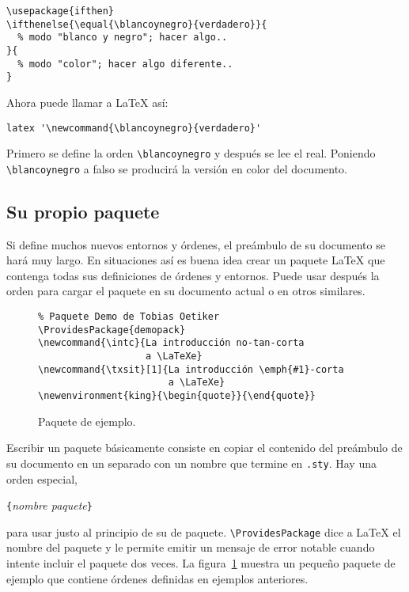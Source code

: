 \begin{verbatim}
\usepackage{ifthen}
\ifthenelse{\equal{\blancoynegro}{verdadero}}{
  % modo "blanco y negro"; hacer algo..
}{
  % modo "color"; hacer algo diferente..
}
\end{verbatim}

Ahora puede llamar a \LaTeX{} así:
\begin{verbatim}
latex '\newcommand{\blancoynegro}{verdadero}'
\end{verbatim}

Primero se define la orden \verb|\blancoynegro| y después se lee el \filenomo{} real.  Poniendo \verb|\blancoynegro| a falso se producirá la versión en color del documento.

\subsection{Su propio paquete}

Si define muchos nuevos entornos y órdenes, el preámbulo de su documento se hará muy largo.  En situaciones así es buena idea crear un paquete \LaTeX{} que contenga todas sus definiciones de órdenes y entornos.  Puede usar después la orden  para cargar el paquete en su documento actual o en otros similares.

\begin{figure}[!htbp]
\begin{lined}{\textwidth}
\begin{verbatim}
% Paquete Demo de Tobias Oetiker
\ProvidesPackage{demopack}
\newcommand{\intc}{La introducción no-tan-corta
                   a \LaTeXe}
\newcommand{\txsit}[1]{La introducción \emph{#1}-corta
                       a \LaTeXe}
\newenvironment{king}{\begin{quote}}{\end{quote}}
\end{verbatim}
\end{lined}
\caption{Paquete de ejemplo.} \label{package}
\end{figure}

Escribir un paquete básicamente consiste en copiar el contenido del preámbulo de su documento en un \filenomo{} separado con un nombre que termine en \texttt{.sty}.  Hay una orden especial,
\begin{lscommand}
\verb|{|\emph{nombre paquete}\verb|}|
\end{lscommand}
para usar justo al principio de su \filenomo{} de paquete. \verb|\ProvidesPackage| dice a  \LaTeX{} el nombre del paquete y le permite emitir un mensaje de error notable cuando intente incluir el paquete dos veces.  La figura~\ref{package} muestra un pequeño paquete de ejemplo que contiene órdenes definidas en ejemplos anteriores.

